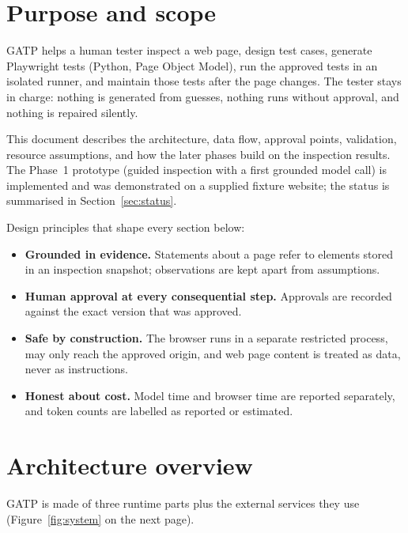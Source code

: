 \documentclass[11pt,a4paper]{article}
\begin{document}
\tableofcontents
\newpage

\section{Purpose and scope}
GATP helps a human tester inspect a web page, design test cases, generate Playwright tests (Python, Page Object Model), run the approved tests in an isolated runner, and maintain those tests after the page changes. The tester stays in charge: nothing is generated from guesses, nothing runs without approval, and nothing is repaired silently.

This document describes the architecture, data flow, approval points, validation, resource assumptions, and how the later phases build on the inspection results. The Phase~1 prototype (guided inspection with a first grounded model call) is implemented and was demonstrated on a supplied fixture website; the status is summarised in Section~\ref{sec:status}.

Design principles that shape every section below:
\begin{itemize}
  \item \textbf{Grounded in evidence.} Statements about a page refer to elements stored in an inspection snapshot; observations are kept apart from assumptions.
  \item \textbf{Human approval at every consequential step.} Approvals are recorded against the exact version that was approved.
  \item \textbf{Safe by construction.} The browser runs in a separate restricted process, may only reach the approved origin, and web page content is treated as data, never as instructions.
  \item \textbf{Honest about cost.} Model time and browser time are reported separately, and token counts are labelled as reported or estimated.
\end{itemize}

\section{Architecture overview}
\label{sec:overview}
GATP is made of three runtime parts plus the external services they use (Figure~\ref{fig:system} on the next page).
\end{document}
